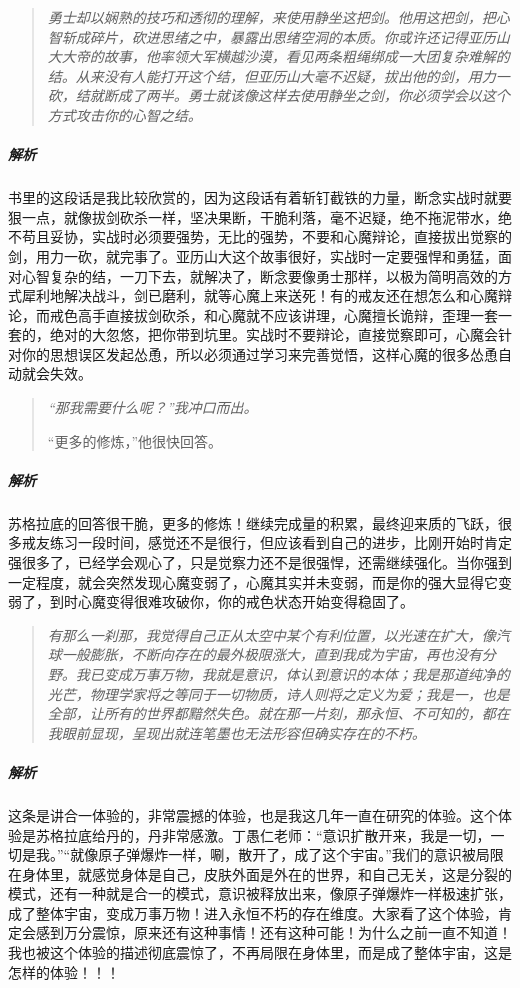 \begin{quote}\it
    勇士却以娴熟的技巧和透彻的理解，来使用静坐这把剑。他用这把剑，把心智斩成碎片，砍进思绪之中，暴露出思绪空洞的本质。你或许还记得亚历山大大帝的故事，他率领大军横越沙漠，看见两条粗绳绑成一大团复杂难解的结。从来没有人能打开这个结，但亚历山大毫不迟疑，拔出他的剑，用力一砍，结就断成了两半。勇士就该像这样去使用静坐之剑，你必须学会以这个方式攻击你的心智之结。
\end{quote}

\subparagraph{解析} 书里的这段话是我比较欣赏的，因为这段话有着斩钉截铁的力量，断念实战时就要狠一点，就像拔剑砍杀一样，坚决果断，干脆利落，毫不迟疑，绝不拖泥带水，绝不苟且妥协，实战时必须要强势，无比的强势，不要和心魔辩论，直接拔出觉察的剑，用力一砍，就完事了。亚历山大这个故事很好，实战时一定要强悍和勇猛，面对心智复杂的结，一刀下去，就解决了，断念要像勇士那样，以极为简明高效的方式犀利地解决战斗，剑已磨利，就等心魔上来送死！有的戒友还在想怎么和心魔辩论，而戒色高手直接拔剑砍杀，和心魔就不应该讲理，心魔擅长诡辩，歪理一套一套的，绝对的大忽悠，把你带到坑里。实战时不要辩论，直接觉察即可，心魔会针对你的思想误区发起怂恿，所以必须通过学习来完善觉悟，这样心魔的很多怂恿自动就会失效。

\begin{quotation}\it
    “那我需要什么呢？”我冲口而出。

    “更多的修炼，”他很快回答。
\end{quotation}

\subparagraph{解析} 苏格拉底的回答很干脆，更多的修炼！继续完成量的积累，最终迎来质的飞跃，很多戒友练习一段时间，感觉还不是很行，但应该看到自己的进步，比刚开始时肯定强很多了，已经学会观心了，只是觉察力还不是很强悍，还需继续强化。当你强到一定程度，就会突然发现心魔变弱了，心魔其实并未变弱，而是你的强大显得它变弱了，到时心魔变得很难攻破你，你的戒色状态开始变得稳固了。

\begin{quote}\it
    有那么一刹那，我觉得自己正从太空中某个有利位置，以光速在扩大，像汽球一般膨胀，不断向存在的最外极限涨大，直到我成为宇宙，再也没有分野。我已变成万事万物，我就是意识，体认到意识的本体；我是那道纯净的光芒，物理学家将之等同于一切物质，诗人则将之定义为爱；我是一，也是全部，让所有的世界都黯然失色。就在那一片刻，那永恒、不可知的，都在我眼前显现，呈现出就连笔墨也无法形容但确实存在的不朽。
\end{quote}

\subparagraph{解析} 这条是讲合一体验的，非常震撼的体验，也是我这几年一直在研究的体验。这个体验是苏格拉底给丹的，丹非常感激。丁愚仁老师：“意识扩散开来，我是一切，一切是我。”“就像原子弹爆炸一样，唰，散开了，成了这个宇宙。”我们的意识被局限在身体里，就感觉身体是自己，皮肤外面是外在的世界，和自己无关，这是分裂的模式，还有一种就是合一的模式，意识被释放出来，像原子弹爆炸一样极速扩张，成了整体宇宙，变成万事万物！进入永恒不朽的存在维度。大家看了这个体验，肯定会感到万分震惊，原来还有这种事情！还有这种可能！为什么之前一直不知道！我也被这个体验的描述彻底震惊了，不再局限在身体里，而是成了整体宇宙，这是怎样的体验！！！


